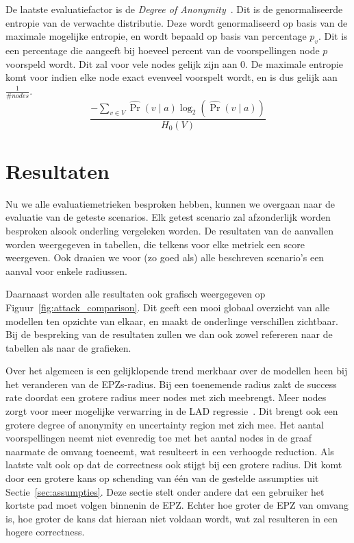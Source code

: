 De laatste evaluatiefactor is de \textit{Degree of
    Anonymity}~\cite{Dhondt,Verdonck_2022}. Dit is de genormaliseerde entropie van
de verwachte distributie. Deze wordt genormaliseerd op basis van de maximale
mogelijke entropie, en wordt bepaald op basis van percentage $p_v$. Dit is een
percentage die aangeeft bij hoeveel percent van de voorspellingen node $p$
voorspeld wordt. Dit zal voor vele nodes gelijk zijn aan 0. De maximale
entropie komt voor indien elke node exact evenveel voorspelt wordt, en is dus
gelijk aan $\frac{1}{\# nodes}$.
\begin{equation}
    \frac{-\sum_{v \in V} \widehat{\operatorname{Pr}}(v \mid a) \log _2(\widehat{\operatorname{Pr}}(v \mid a))}{H_0(V)}\label{eq:degree_of_anonymity}
\end{equation}

\section{Resultaten}
Nu we alle evaluatiemetrieken besproken hebben, kunnen we overgaan naar de
evaluatie van de geteste scenarios. Elk getest scenario zal afzonderlijk worden
besproken alsook onderling vergeleken worden. De resultaten van de aanvallen
worden weergegeven in tabellen, die telkens voor elke metriek een score
weergeven. Ook draaien we voor (zo goed als) alle beschreven scenario's een
aanval voor enkele radiussen.

Daarnaast worden alle resultaten ook grafisch weergegeven op
Figuur~\ref{fig:attack_comparison}. Dit geeft een mooi globaal overzicht van
alle modellen ten opzichte van elkaar, en maakt de onderlinge verschillen
zichtbaar. Bij de bespreking van de resultaten zullen we dan ook zowel
refereren naar de tabellen als naar de grafieken.

Over het algemeen is een gelijklopende trend merkbaar over de modellen heen bij
het veranderen van de \acp{EPZ}-radius. Bij een toenemende radius zakt de
success rate doordat een grotere radius meer nodes met zich meebrengt. Meer
nodes zorgt voor meer mogelijke verwarring in de \ac{LAD}
regressie~\cite{Verdonck_2022}. Dit brengt ook een grotere degree of anonymity
en uncertainty region met zich mee. Het aantal voorspellingen neemt niet
evenredig toe met het aantal nodes in de graaf naarmate de omvang toeneemt, wat
resulteert in een verhoogde reduction. Als laatste valt ook op dat de
correctness ook stijgt bij een grotere radius. Dit komt door een grotere kans
op schending van één van de gestelde assumpties uit
Sectie~\ref{sec:assumpties}. Deze sectie stelt onder andere dat een gebruiker
het kortste pad moet volgen binnenin de \ac{EPZ}. Echter hoe groter de \ac{EPZ}
van omvang is, hoe groter de kans dat hieraan niet voldaan wordt, wat zal
resulteren in een hogere correctness.


